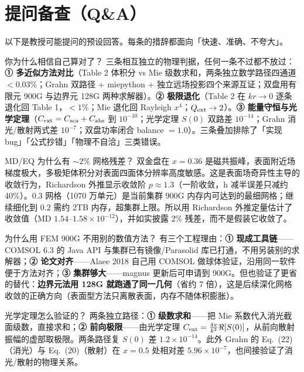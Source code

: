 \section{提问备查（Q\&A）}

以下是教授可能提问的预设回答。每条的措辞都面向「快速、准确、不夸大」。

\begin{qanda}{你为什么相信自己算对了？}
三条相互独立的物理判据，任何一条不过都不放过：\textbf{① 多近似方法对比}（Table 2 体积分 vs Mie 级数求和，两条独立数学路径四通道 $<0.03\%$；Grahn 双路径 + miepython + 独立远场投影四个来源互证；双盘用有限元 900G 与边界元 128G 两种求解器）。\textbf{② 极限退化}（Table 2 在 $kr\to0$ 逐条退化回 Table 1，$<1\%$；Mie 退化回 Rayleigh $x^4$；$Q_{\rm ext}\to2$）。\textbf{③ 能量守恒与光学定理}（$C_{\rm ext}=C_{\rm sca}+C_{\rm abs}$ 到 $10^{-10}$；光学定理 $S(0)$ 双路差 $10^{-14}$；Grahn 消光/散射两式差 $10^{-7}$；双盘功率闭合 balance $=1.0$）。三条叠加排除了「实现 bug」「公式抄错」「物理不自洽」三类错误。
\end{qanda}

\begin{qanda}{MD/EQ 为什么有 $\sim2\%$ 网格残差？}
双金盘在 $x=0.36$ 是磁共振峰，表面附近场梯度极大，多极矩体积分对表面四面体分辨率高度敏感。这是表面场奇异性主导的收敛行为，Richardson 外推显示收敛阶 $p\approx1.3$（一阶收敛，h 减半误差只减约 40\%）。$0.3$ 网格（1070 万单元）是当前集群 900G 内存内可达到的最细网格；继续细化到 $0.2$ 需约 2TB 内存，超集群上限。所以用 Richardson 外推定量估计了收敛值（MD $1.54$--$1.58\times10^{-12}$），并如实披露 $2\%$ 残差，而不是假装它收敛了。
\end{qanda}

\begin{qanda}{为什么用 FEM 900G 不用别的数值方法？}
有三个工程理由：\textbf{① 现成工具链}——COMSOL 6.3 的 Java API 与集群已有镜像/Parasolid 库已打通，不用另装别的求解器；\textbf{② 论文对齐}——Alaee 2018 自己用 COMSOL 做球体验证，沿用同一软件便于方法对齐；\textbf{③ 集群够大}——magnus 更新后可申请到 900G。但也验证了更省的替代：\textbf{边界元法用 128G 就跑通了同一几何}（省约 7 倍），这是后续深化网格收敛的正确方向（表面型方法只离散表面，内存不随体积膨胀）。
\end{qanda}

\begin{qanda}{光学定理怎么验证的？}
两条独立路径：\textbf{① 级数求和}——把 Mie 系数代入消光截面级数，直接求和；\textbf{② 前向极限}——由光学定理 $C_{\rm ext}=\frac{4\pi}{k^2}\Re[S(0)]$，从前向散射振幅的虚部取极限。两条路径复 $S(0)$ 差 $1.2\times10^{-14}$。此外 Grahn 的 Eq.~(22)（消光）与 Eq.~(20)（散射）在 $x=0.5$ 处相对差 $5.96\times10^{-7}$，也间接验证了消光/散射的物理关系。
\end{qanda}

